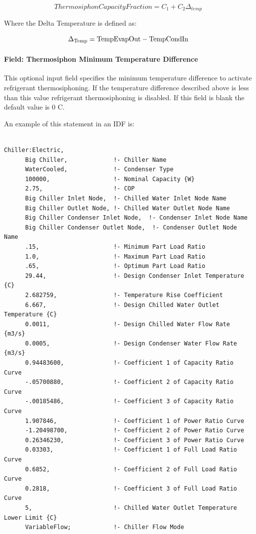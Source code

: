 \begin{equation}
    ThermosiphonCapacityFraction = {C_1} + {C_2}{\Delta_{temp}}
\end{equation}

Where the Delta Temperature is defined as:

\begin{equation}
{\Delta_{{\rm{Temp}}}}
    = {\rm{TempEvapOut  -  TempCondIn }}
\end{equation}

\paragraph{Field: Thermosiphon Minimum Temperature Difference}\label{thermosiphon-minimum-temperature-difference2}

This optional input field specifies the minimum temperature difference to activate refrigerant thermosiphoning. If the temperature difference described above is less than this value refrigerant thermosiphoning is disabled. If this field is blank the default value is 0 C.


An example of this statement in an IDF is:

\begin{lstlisting}

Chiller:Electric,
      Big Chiller,             !- Chiller Name
      WaterCooled,             !- Condenser Type
      100000,                  !- Nominal Capacity {W}
      2.75,                    !- COP
      Big Chiller Inlet Node,  !- Chilled Water Inlet Node Name
      Big Chiller Outlet Node, !- Chilled Water Outlet Node Name
      Big Chiller Condenser Inlet Node,  !- Condenser Inlet Node Name
      Big Chiller Condenser Outlet Node,  !- Condenser Outlet Node Name
      .15,                     !- Minimum Part Load Ratio
      1.0,                     !- Maximum Part Load Ratio
      .65,                     !- Optimum Part Load Ratio
      29.44,                   !- Design Condenser Inlet Temperature {C}
      2.682759,                !- Temperature Rise Coefficient
      6.667,                   !- Design Chilled Water Outlet Temperature {C}
      0.0011,                  !- Design Chilled Water Flow Rate {m3/s}
      0.0005,                  !- Design Condenser Water Flow Rate {m3/s}
      0.94483600,              !- Coefficient 1 of Capacity Ratio Curve
      -.05700880,              !- Coefficient 2 of Capacity Ratio Curve
      -.00185486,              !- Coefficient 3 of Capacity Ratio Curve
      1.907846,                !- Coefficient 1 of Power Ratio Curve
      -1.20498700,             !- Coefficient 2 of Power Ratio Curve
      0.26346230,              !- Coefficient 3 of Power Ratio Curve
      0.03303,                 !- Coefficient 1 of Full Load Ratio Curve
      0.6852,                  !- Coefficient 2 of Full Load Ratio Curve
      0.2818,                  !- Coefficient 3 of Full Load Ratio Curve
      5,                       !- Chilled Water Outlet Temperature Lower Limit {C}
      VariableFlow;            !- Chiller Flow Mode
\end{lstlisting}


